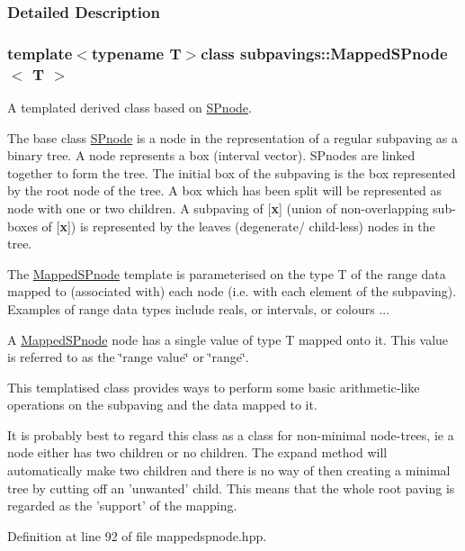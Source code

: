 \subsubsection{\-Detailed \-Description}
\subsubsection*{template$<$typename \-T$>$class subpavings\-::\-Mapped\-S\-Pnode$<$ T $>$}

\-A templated derived class based on \hyperlink{classsubpavings_1_1SPnode}{\-S\-Pnode}. 

\-The base class \hyperlink{classsubpavings_1_1SPnode}{\-S\-Pnode} is a node in the representation of a regular subpaving as a binary tree. \-A node represents a box (interval vector). \-S\-Pnodes are linked together to form the tree. \-The initial box of the subpaving is the box represented by the root node of the tree. \-A box which has been split will be represented as node with one or two children. \-A subpaving of \mbox{[}{\bfseries x}\mbox{]} (union of non-\/overlapping sub-\/ boxes of \mbox{[}{\bfseries x}\mbox{]}) is represented by the leaves (degenerate/ child-\/less) nodes in the tree.

\-The \hyperlink{classsubpavings_1_1MappedSPnode}{\-Mapped\-S\-Pnode} template is parameterised on the type \-T of the range data mapped to (associated with) each node (i.\-e. with each element of the subpaving). \-Examples of range data types include reals, or intervals, or colours ...

\-A \hyperlink{classsubpavings_1_1MappedSPnode}{\-Mapped\-S\-Pnode} node has a single value of type \-T mapped onto it. \-This value is referred to as the \char`\"{}range value\char`\"{} or \char`\"{}range\char`\"{}.

\-This templatised class provides ways to perform some basic arithmetic-\/like operations on the subpaving and the data mapped to it.

\-It is probably best to regard this class as a class for non-\/minimal node-\/trees, ie a node either has two children or no children. \-The expand method will automatically make two children and there is no way of then creating a minimal tree by cutting off an 'unwanted' child. \-This means that the whole root paving is regarded as the 'support' of the mapping. 

\-Definition at line 92 of file mappedspnode.\-hpp.



